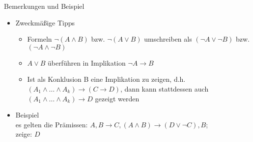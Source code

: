 \begin{frame}{Bemerkungen und Beispiel}
	\begin{itemize}
		\item Zweckmäßige Tipps
		\begin{itemize}
			\item Formeln $\neg (A \land B)$ bzw. $\neg (A \lor B)$ umschreiben als $(\neg A \lor \neg B)$ bzw. $(\neg A \land \neg B)$
			\item $A \lor B$ überführen in Implikation $\neg A \rightarrow B$
			\item Ist als Konklusion B eine Implikation zu zeigen, d.h.\\
			$(A_1 \land \ldots \land A_k) \rightarrow (C \rightarrow D)$, dann kann stattdessen auch\\
			$(A_1 \land \ldots \land A_k) \rightarrow D$ gezeigt werden
		\end{itemize}
		\item Beispiel\\
			es gelten die Prämissen: $A, B \rightarrow C, (A \land B) \rightarrow (D \lor \neg C), B$;\\
			zeige: $D$
	\end{itemize}
\end{frame}

